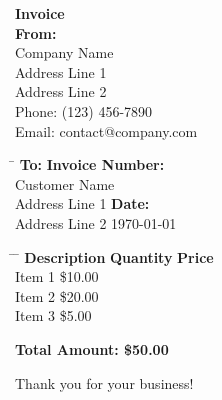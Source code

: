 \documentclass[a4paper,12pt]{article}
\begin{document}
\begin{center}
    \textbf{\LARGE Invoice}\\[1em]
    \textbf{From:}\\
    Company Name\\
    Address Line 1\\
    Address Line 2\\
    Phone: (123) 456-7890\\
    Email: contact@company.com
\end{center}

\vspace{2em}

\begin{tabbing}
    \hspace{3in} \= \kill
    \textbf{To:} \> \textbf{Invoice Number:} \\
    Customer Name  \\
    Address Line 1 \> \textbf{Date:} \\
    Address Line 2 \> \today \\
\end{tabbing}

\vspace{2em}

\begin{tabbing}
    \hspace{2in} \= \hspace{2in} \= \kill
    \textbf{Description} \> \textbf{Quantity} \> \textbf{Price} \\
    Item 1  \> \$10.00 \\
    Item 2  \> \$20.00 \\
    Item 3  \> \$5.00 \\
\end{tabbing}

\vspace{2em}

\textbf{Total Amount: \$50.00}

\vspace{2em}

\begin{center}
    Thank you for your business!
\end{center}
\end{document}
